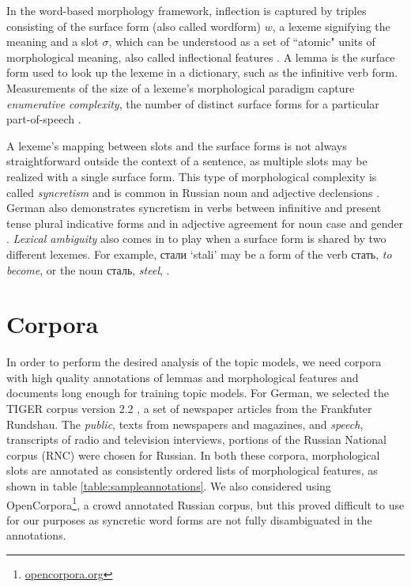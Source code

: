 \documentclass[11pt,a4paper]{article}
\begin{document}
In the word-based morphology framework, inflection is captured by triples consisting of the surface form (also called wordform) $w$, a lexeme  signifying the meaning and a slot $\sigma$, which can be understood as a set of ``atomic" units of morphological meaning, also called inflectional features \cite{aronoff1976word,sylak-glassman-etal-2015-language,cotterell-etal-2019-complexity}.
A lemma is the surface form used to look up the lexeme in a dictionary, such as the infinitive verb form. Measurements of the size of a lexeme's morphological paradigm capture \textit{enumerative complexity}, the number of distinct surface forms for a particular part-of-speech \cite{Ackerman2013MorphologicalOT}.

A lexeme's mapping between slots and the surface forms is not always straightforward outside the context of a sentence, as multiple slots may be realized with a single surface form. This type of morphological complexity is called \textit{syncretism} and is common in Russian noun and adjective declensions \cite{baerman2015understanding,Milizia2015PatternsOS}. German also demonstrates syncretism in verbs between infinitive and present tense plural indicative forms and in adjective agreement for noun case and gender \cite{Crysmann2005SyncretismIG}. \textit{Lexical ambiguity} also comes in to play when a surface form is shared by two different lexemes. For example, \foreignlanguage{russian}{стали} `stali' may be a form of the verb \foreignlanguage{russian}{стать}, \textit{to become}, or the noun \foreignlanguage{russian}{сталь}, \textit{steel}, \cite{Sharoff2011ThePP}.

\section{Corpora}
In order to perform the desired analysis of the topic models, we need corpora with high quality annotations of lemmas and morphological features and documents long enough for training topic models. For German, we selected the TIGER corpus version 2.2 \cite{Brants2004TIGERLI}, a set of newspaper articles from the Frankfuter Rundshau. The \textit{public}, texts from newspapers and magazines, and \textit{speech}, transcripts of radio and television interviews, portions of the Russian National corpus (RNC) were chosen for Russian. In both these corpora, morphological slots are annotated as consistently ordered lists of morphological features, as shown in table \ref{table:sampleannotations}. We also considered using OpenCorpora\footnote{\url{opencorpora.org}}, a crowd annotated Russian corpus, but this proved difficult to use for our purposes as syncretic word forms are not fully disambiguated in the annotations.
\end{document}
